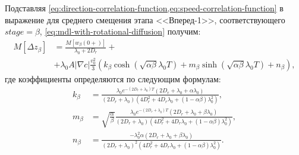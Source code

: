 Подставляя \cref{eq:direction-correlation-function,eq:speed-correlation-function} в выражение для среднего смещения этапа <<Вперед-1>>, соответствующего $stage=\beta$, \cref{eq:mdl-with-rotational-diffusion} получим:
\begin{equation}
    \begin{aligned}
        M[\Delta z_{\beta}]&=\frac{M[w_{\beta}(0+)]}{\lambda_0+2 D_r} + \\ &+ \lambda_0 A |\nabla c| \frac{v_0^2}{3} \left ( k_{\beta} \cosh \left (\sqrt{\alpha \beta} \lambda_0 T \right ) + m_{\beta} \sinh \left (\sqrt{\alpha \beta} \lambda_0 T \right ) + n_{\beta} \right ),
        \label{eq:mdlrd-solution-beta}
    \end{aligned}
\end{equation}
где коэффициенты определяются по следующим формулам:
\begin{equation}
    \begin{aligned}
        k_{\beta}&=\frac{\lambda_0 e^{-(2D_r+\lambda_0)T}\left (2D_r+\lambda_0+\alpha\lambda_0 \right )}{(2D_r+\lambda_0)\left (4D_r^2+4D_r\lambda_0+(1-\alpha\beta)\lambda_0^2\right )}, \\
        m_{\beta}&=\sqrt{\frac{\alpha}{\beta}}\frac{\lambda_0 e^{-(2D_r+\lambda_0)T}\left (2D_r+\lambda_0+\beta\lambda_0 \right )}{(2D_r+\lambda_0)\left (4D_r^2+4D_r\lambda_0+(1-\alpha\beta)\lambda_0^2 \right )}, \\
        n_{\beta}&=\frac{-\lambda_0^2 \alpha \left (2D_r+\lambda_0+\beta\lambda_0 \right )}{(2D_r+\lambda_0)^2\left (4D_r^2+4D_r\lambda_0+(1-\alpha\beta)\lambda_0^2 \right )}. \\
        \label{eq:mdlrd-solution-beta-coeffs}
    \end{aligned}
\end{equation}

